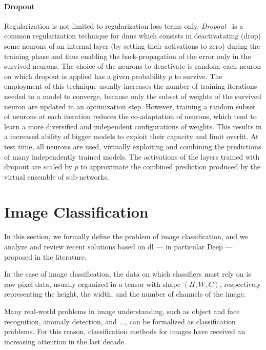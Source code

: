 \paragraph{Dropout}
Regularization is not limited to regularization loss terms only.
\emph{Dropout}~\cite{hinton2012improving} is a common regularization technique for \glspl{dnn} which consists in deactivatating (drop) some neurons of an internal layer (by setting their activations to zero) during the training phase and thus enabling the back-propagation of the error only in the survived neurons.
The choice of the neurons to deactivate is random: each neuron on which dropout is applied has a given probability $p$ to survive.
The employment of this technique usually increases the number of training iterations needed to a model to converge, because only the subset of weights of the survived neuron are updated in an optimization step.
However, training a random subset of neurons at each iteration reduces the co-adaptation of neurons, which tend to learn a more diversified and independent configurations of weights.
This results in a increased ability of bigger models to exploit their capacity and limit overfit.
At test time, all neurons are used, virtually exploiting and combining the predictions of many independently trained models.
The activations of the layers trained with dropout are scaled by $p$ to approximate the combined prediction produced by the virtual ensemble of sub-networks.


\section{Image Classification}
\label{sec:back:image-classification}

In this section, we formally define the problem of image classification, and we analyze and review recent solutions based on \acrlong{dl} --- in particular Deep  --- proposed in the literature.

In the case of image classification, the data on which classifiers must rely on is raw pixel data, usually organized in a tensor with shape $(H, W, C)$, respectively representing the height, the width, and the number of channels of the image.

Many real-world problems in image understanding, such as object and face recognition, anomaly detection, and ..., can be formalized as classification problems.
For this reason, classification methods for images have received an increasing attention in the last decade.

